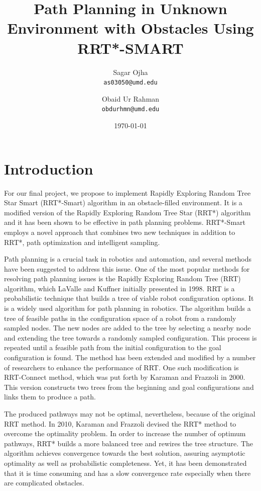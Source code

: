 \documentclass[12pt]{extarticle}
\title{Path Planning in Unknown Environment with Obstacles Using RRT*-SMART}
\author{
	Sagar Ojha \\
	\texttt{as03050@umd.edu}
	\and
	Obaid Ur Rahman\\
	\texttt{obdurhmn@umd.edu}}
\date{\today}
\begin{document}
\maketitle
\newpage
\section{Introduction}
\hspace{\parindent}For our final project, we propose to implement Rapidly Exploring Random Tree Star Smart (RRT*-Smart) algorithm in an obstacle-filled environment. It is a modified version of the Rapidly Exploring Random Tree Star (RRT*) algorithm and it has been shown to be effective in path planning problems. RRT*-Smart employs a novel approach that combines two new techniques in addition to RRT*, path optimization and intelligent sampling.

Path planning is a crucial task in robotics and automation, and several methods have been suggested to address this issue. One of the most popular methods for resolving path planning issues is the Rapidly Exploring Random Tree (RRT) algorithm, which LaValle and Kuffner \cite{La} initially presented in 1998. RRT is a probabilistic technique that builds a tree of viable robot configuration options. It is a widely used algorithm for path planning in robotics. The algorithm builds a tree of feasible paths in the configuration space of a robot from a randomly sampled nodes. The new nodes are added to the tree by selecting a nearby node and extending the tree towards a randomly sampled configuration. This process is repeated until a feasible path from the initial configuration to the goal configuration is found. The method has been extended and modified by a number of researchers to enhance the performance of RRT. One such modification is RRT-Connect method, which was put forth by Karaman and Frazzoli in 2000. This version constructs two trees from the beginning and goal configurations and links them to produce a path.

The produced pathways may not be optimal, nevertheless, because of the original RRT method. In 2010, Karaman and Frazzoli devised the RRT* method to overcome the optimality problem. In order to increase the number of optimum pathways, RRT* builds a more balanced tree and rewires the tree structure. The algorithm achieves convergence towards the best solution, assuring asymptotic optimality as well as probabilistic completeness. Yet, it has been demonstrated that it is time consuming and has a slow convergence rate especially when there are complicated obstacles.
\end{document}
